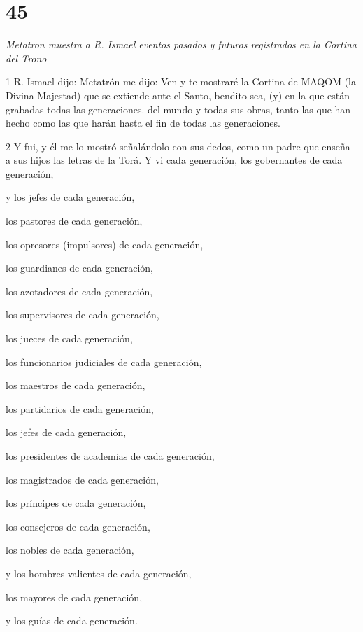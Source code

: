 \chapter{45}

\par \textit{Metatron muestra a R. Ismael eventos pasados ​​y futuros registrados en la Cortina del Trono}

\par 1 R. Ismael dijo: Metatrón me dijo: Ven y te mostraré la Cortina de MAQOM (la Divina Majestad) que se extiende ante el Santo, bendito sea, (y) en la que están grabadas todas las generaciones. del mundo y todas sus obras, tanto las que han hecho como las que harán hasta el fin de todas las generaciones.

\par 2 Y fui, y él me lo mostró señalándolo con sus dedos, como un padre que enseña a sus hijos las letras de la Torá. Y vi cada generación, los gobernantes de cada generación,
\par y los jefes de cada generación,
\par los pastores de cada generación,
\par los opresores (impulsores) de cada generación,
\par los guardianes de cada generación,
\par los azotadores de cada generación,
\par los supervisores de cada generación,
\par los jueces de cada generación,
\par los funcionarios judiciales de cada generación,
\par los maestros de cada generación,
\par los partidarios de cada generación,
\par los jefes de cada generación,
\par los presidentes de academias de cada generación,
\par los magistrados de cada generación,
\par los príncipes de cada generación,
\par los consejeros de cada generación,
\par los nobles de cada generación,
\par y los hombres valientes de cada generación,
\par los mayores de cada generación,
\par y los guías de cada generación.

